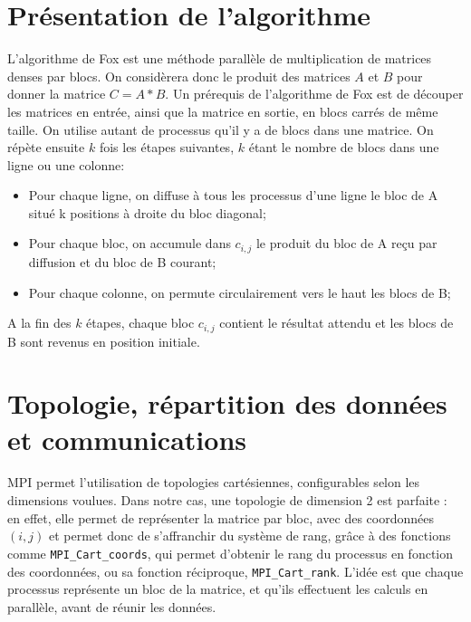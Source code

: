 \documentclass[a4paper,11pt]{article}
\begin{document}
\section{Présentation de l'algorithme}
L'algorithme de Fox est une méthode parallèle de multiplication de matrices denses par blocs. On considèrera donc le produit des matrices $A$ et $B$ pour donner la matrice $C=A*B$.
Un prérequis de l'algorithme de Fox est de découper les matrices en entrée, ainsi que la matrice en sortie, en blocs carrés de même taille. On utilise autant de processus qu'il y a de blocs dans une matrice.
On répète ensuite $k$ fois les étapes suivantes, $k$ étant le nombre de blocs dans une ligne ou une colonne:
\begin{itemize}
\item Pour chaque ligne, on diffuse à tous les processus d'une ligne le bloc de A situé k positions à droite du bloc diagonal;
\item Pour chaque bloc, on accumule dans $c_{i,j}$ le produit du bloc de A reçu par diffusion et du bloc de B courant;  
\item Pour chaque colonne, on permute circulairement vers le haut les blocs de B;
\end{itemize}

A la fin des $k$ étapes, chaque bloc $c_{i,j}$ contient le résultat attendu et les blocs de B sont revenus en position initiale.


\section{Topologie, répartition des données et communications}
MPI permet l'utilisation de topologies cartésiennes, configurables selon les dimensions voulues. Dans notre cas, une topologie de dimension 2 est parfaite : en effet, elle permet de représenter la matrice par bloc, avec des coordonnées $(i,j)$ et permet donc de s'affranchir du système de rang, grâce à des fonctions comme \texttt{MPI\_Cart\_coords}, qui permet d'obtenir le rang du processus en fonction des coordonnées, ou sa fonction réciproque, \texttt{MPI\_Cart\_rank}.
L'idée est que chaque processus représente un bloc de la matrice, et qu'ils effectuent les calculs en parallèle, avant de réunir les données.
\end{document}
